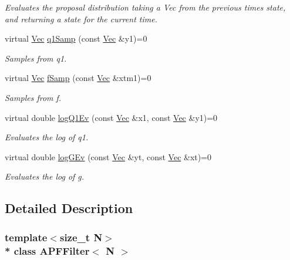 \begin{DoxyCompactItemize}
\begin{DoxyCompactList}\small\item\em Evaluates the proposal distribution taking a Vec from the previous time\textquotesingle{}s state, and returning a state for the current time. \end{DoxyCompactList}\item 
virtual \hyperlink{apf__filter_8h_a4c7df05c6f5e8a0d15ae14bcdbc07152}{Vec} \hyperlink{classAPFFilter_a63b58cc57c9ebc33042a745262f72777}{q1\+Samp} (const \hyperlink{apf__filter_8h_a4c7df05c6f5e8a0d15ae14bcdbc07152}{Vec} \&y1)=0
\begin{DoxyCompactList}\small\item\em Samples from q1. \end{DoxyCompactList}\item 
virtual \hyperlink{apf__filter_8h_a4c7df05c6f5e8a0d15ae14bcdbc07152}{Vec} \hyperlink{classAPFFilter_a3b2a7e9638bce587a9b81ada9da951d1}{f\+Samp} (const \hyperlink{apf__filter_8h_a4c7df05c6f5e8a0d15ae14bcdbc07152}{Vec} \&xtm1)=0
\begin{DoxyCompactList}\small\item\em Samples from f. \end{DoxyCompactList}\item 
virtual double \hyperlink{classAPFFilter_a149fdaf9f3479dd5044176eb369a99aa}{log\+Q1\+Ev} (const \hyperlink{apf__filter_8h_a4c7df05c6f5e8a0d15ae14bcdbc07152}{Vec} \&x1, const \hyperlink{apf__filter_8h_a4c7df05c6f5e8a0d15ae14bcdbc07152}{Vec} \&y1)=0
\begin{DoxyCompactList}\small\item\em Evaluates the log of q1. \end{DoxyCompactList}\item 
virtual double \hyperlink{classAPFFilter_a4ea311b6d8549ac2746f9d54d82b64aa}{log\+G\+Ev} (const \hyperlink{apf__filter_8h_a4c7df05c6f5e8a0d15ae14bcdbc07152}{Vec} \&yt, const \hyperlink{apf__filter_8h_a4c7df05c6f5e8a0d15ae14bcdbc07152}{Vec} \&xt)=0
\begin{DoxyCompactList}\small\item\em Evaluates the log of g. \end{DoxyCompactList}\end{DoxyCompactItemize}


\subsection{Detailed Description}
\subsubsection*{template$<$size\+\_\+t N$>$\\*
class A\+P\+F\+Filter$<$ N $>$}

